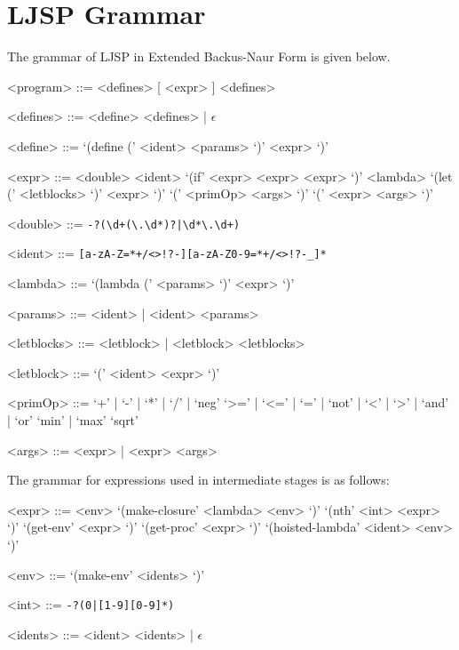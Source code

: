 \documentclass[11pt]{report}
\begin{document}
\section{LJSP Grammar}
The grammar of LJSP in Extended Backus-Naur Form is given below.
\begin{grammar}
<program> ::= <defines> [ <expr> ] <defines>

<defines> ::= <define> <defines> | $\epsilon$

<define> ::= `(define (' <ident> <params> `)' <expr> `)'

<expr> ::= <double>
\alt <ident>
\alt `(if' <expr> <expr> <expr> `)'
\alt <lambda>
\alt `(let (' <letblocks> `)' <expr> `)'
\alt `(' <primOp> <args> `)'
\alt `(' <expr> <args> `)'

<double> ::= \texttt{-?(\textbackslash d+(\textbackslash.\textbackslash d*)?|\textbackslash d*\textbackslash.\textbackslash d+)}

<ident> ::= \texttt{[a-zA-Z=*+/\textless\textgreater!?-][a-zA-Z0-9=*+/\textless\textgreater!?-_]*}

<lambda> ::= `(lambda (' <params> `)' <expr> `)'

<params> ::= <ident> | <ident> <params>

<letblocks> ::= <letblock> | <letblock> <letblocks>

<letblock> ::= `(' <ident> <expr> `)'

<primOp> ::= `+' | `-' | `*' | `/' | `neg'
\alt `>=' | `<=' | `=' | `not' | `<' | `>' | `and' | `or'
\alt `min' | `max'
\alt `sqrt'

<args> ::= <expr> | <expr> <args>
\end{grammar}

The grammar for expressions used in intermediate stages is as follows:
\begin{grammar}
<expr> ::= <env>
\alt `(make-closure' <lambda> <env> `)'
\alt `(nth' <int> <expr> `)'
\alt `(get-env' <expr> `)'
\alt `(get-proc' <expr> `)'
\alt `(hoisted-lambda' <ident> <env> `)'

<env> ::= `(make-env' <idents> `)'

<int> ::= \texttt{-?(0|[1-9][0-9]*)}

<idents> ::= <ident> <idents> | $\epsilon$
\end{grammar}


\end{document}
